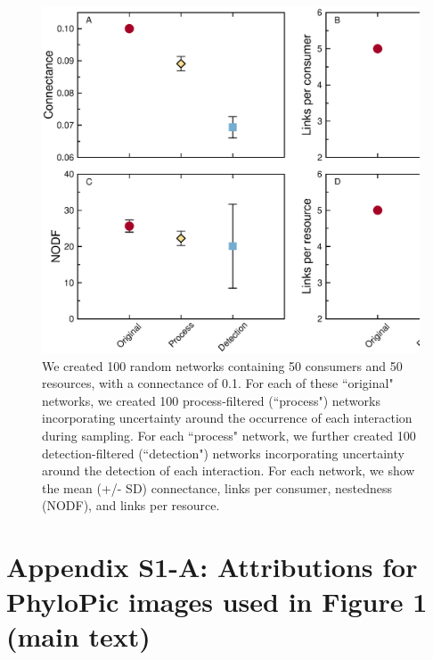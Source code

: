 \documentclass[12pt]{article}
\begin{document}
  \begin{figure}
  \caption{We created 100 random networks containing 50 consumers and 50 resources, with a connectance of 0.1. For each of these ``original" networks, we created 100 process-filtered (``process") networks incorporating uncertainty around the occurrence of each interaction during sampling. For each ``process" network, we further created 100 detection-filtered (``detection") networks incorporating uncertainty around the detection of each interaction. For each network, we show the mean (+/- SD) connectance, links per consumer, nestedness (NODF), and links per resource.}
  \label{sim_props}
  \begin{center}
  \includegraphics*[width=.9\textwidth]{figures/simulation_example.eps}
  \end{center}
  \end{figure}


\clearpage


\section*{Appendix S1-A: Attributions for PhyloPic images used in Figure 1 (main text)}
\end{document}
